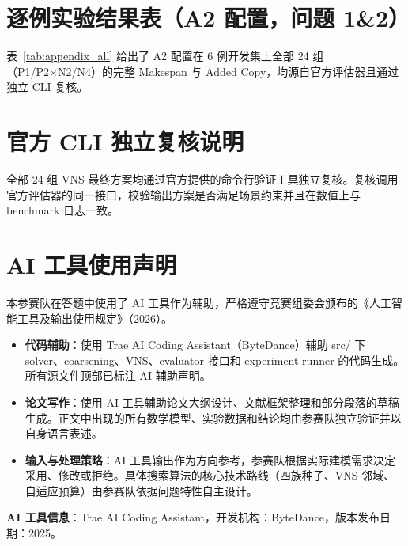 \documentclass[bwprint]{gmcmthesis}
\begin{document}
\newpage
\appendix

\section{逐例实验结果表（A2 配置，问题 1\&2）}

\label{app:results}

表~\ref{tab:appendix_all} 给出了 A2 配置在 6 例开发集上全部 24 组（P1/P2×N2/N4）的完整 Makespan 与 Added Copy，均源自官方评估器且通过独立 CLI 复核。

\small


\section{官方 CLI 独立复核说明}
\label{app:cli_verification}

全部 24 组 VNS 最终方案均通过官方提供的命令行验证工具独立复核。复核调用官方评估器的同一接口，校验输出方案是否满足场景约束并且在数值上与 benchmark 日志一致。

\section{AI 工具使用声明}
\label{app:ai_declaration}

本参赛队在答题中使用了 AI 工具作为辅助，严格遵守竞赛组委会颁布的《人工智能工具及输出使用规定》（2026）。

\begin{itemize}
  \item \textbf{代码辅助}：使用 Trae AI Coding Assistant（ByteDance）辅助 src/ 下 solver、coarsening、VNS、evaluator 接口和 experiment runner 的代码生成。所有源文件顶部已标注 AI 辅助声明。
  \item \textbf{论文写作}：使用 AI 工具辅助论文大纲设计、文献框架整理和部分段落的草稿生成。正文中出现的所有数学模型、实验数据和结论均由参赛队独立验证并以自身语言表述。
  \item \textbf{输入与处理策略}：AI 工具输出作为方向参考，参赛队根据实际建模需求决定采用、修改或拒绝。具体搜索算法的核心技术路线（四族种子、VNS 邻域、自适应预算）由参赛队依据问题特性自主设计。
\end{itemize}

\textbf{AI 工具信息}：Trae AI Coding Assistant，开发机构：ByteDance，版本发布日期：2025。
\end{document}
